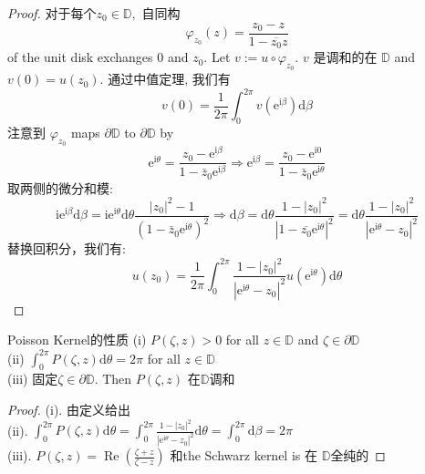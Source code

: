 \documentclass[cn,11pt,chinese,black]{elegantbook}
\begin{document}
	\begin{proof}
		对于每个$z_{0} \in \mathbb{D},$ 自同构
		\[
		\varphi_{z_{0}}(z)=\frac{z_{0}-z}{1-\overline{z_{0}} z}
		\]
		of the unit disk exchanges 0 and $z_{0} .$ Let $v:=u \circ \varphi_{z_{0}} .$ $v$ 是调和的在 $\mathbb{D}$ and $v(0)=u\left(z_{0}\right) .$ 通过中值定理, 我们有
		\[
		v(0)=\frac{1}{2 \pi} \int_{0}^{2 \pi} v\left(\mathrm{e}^{\mathrm{i} \beta}\right) \mathrm{d} \beta
		\]
		注意到 $\varphi_{z_{0}}$ maps $\partial \mathbb{D}$ to $\partial \mathbb{D}$ by
		\[
		\mathrm{e}^{\mathrm{i} \theta}=\frac{z_{0}-\mathrm{e}^{\mathrm{i} \beta}}{1-\bar{z}_{0} \mathrm{e}^{\mathrm{i} \beta}} \Rightarrow \mathrm{e}^{\mathrm{i} \beta}=\frac{z_{0}-\mathrm{e}^{\mathrm{i} 0}}{1-\bar{z}_{0} \mathrm{e}^{\mathrm{i} \theta}}
		\]
		取两侧的微分和模:
		\[
		\mathrm{i} \mathrm{e}^{\mathrm{i} \beta} \mathrm{d} \beta=\mathrm{i} \mathrm{e}^{\mathrm{i} \theta} \mathrm{d} \theta \frac{\left|z_{0}\right|^{2}-1}{\left(1-\bar{z}_{0} \mathrm{e}^{\mathrm{i} \theta}\right)^{2}} \Rightarrow \mathrm{d} \beta=\mathrm{d} \theta \frac{1-\left|z_{0}\right|^{2}}{\left|1-\overline{z_{0}} \mathrm{e}^{\mathrm{i} \theta}\right|^{2}}=\mathrm{d} \theta \frac{1-\left|z_{0}\right|^{2}}{\left|\mathrm{e}^{\mathrm{i} \theta}-z_{0}\right|^{2}}
		\]
		替换回积分，我们有:
		\[
		u\left(z_{0}\right)=\frac{1}{2 \pi} \int_{0}^{2 \pi} \frac{1-\left|z_{0}\right|^{2}}{\left|\mathrm{e}^{\mathrm{i} \theta}-z_{0}\right|^{2}} u\left(\mathrm{e}^{\mathrm{i} \theta}\right) \mathrm{d} \theta
		\]
	\end{proof}
	\begin{corollary}{Poisson Kernel的性质}
		(i) $P(\zeta, z)>0$ for all $z \in \mathbb{D}$ and $\zeta \in \partial \mathbb{D}$\\
		(ii) $\int_{0}^{2 \pi} P(\zeta, z) \mathrm{d} \theta=2 \pi$ for all $z \in \mathbb{D}$\\
		(iii) 固定$\zeta \in \partial \mathbb{D} .$ Then $P(\zeta, z)$ 在$\mathbb{D}$调和
	\end{corollary}
	\begin{proof}
		(i). 由定义给出\\
		(ii). $\int_{0}^{2 \pi} P(\zeta, z) \mathrm{d} \theta=\int_{0}^{2 \pi} \frac{1-\left|z_{0}\right|^{2}}{\left|\mathrm{e}^{\mathrm{i} \theta}-z_{0}\right|^{2}} \mathrm{d} \theta=\int_{0}^{2 \pi} \mathrm{d} \beta=2 \pi$\\
		(iii). $P(\zeta, z)=\operatorname{Re}\left(\frac{\zeta+z}{\zeta-z}\right)$ 和the Schwarz kernel is 在 $\mathbb{D}$全纯的
	\end{proof}
\end{document}
